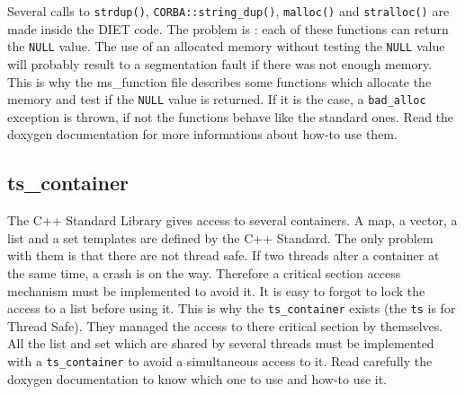 Several calls to \texttt{strdup()}, \texttt{CORBA::string\_dup()},
\texttt{malloc()} and \texttt{stralloc()} are made inside the DIET code. The
problem is : each of these functions can return the \texttt{NULL} value. The
use of an allocated memory without testing the \texttt{NULL} value will
probably result to a segmentation fault if there was not enough memory. This
is why the \textsf{ms\_function} file describes some functions which allocate
the memory and test if the \texttt{NULL} value is returned. If it is the case,
a \texttt{bad\_alloc} exception is thrown, if not the functions behave like the
standard ones. Read the doxygen documentation for more informations about
how-to use them.

\subsection{\textsf{ts\_container}}

The C++ Standard Library gives access to several containers. A map, a vector, a
list and a set templates are defined by the C++ Standard. The only problem with
them is that there are not thread safe. If two threads alter a container at the
same time, a crash is on the way. Therefore a critical section access mechanism
must be implemented to avoid it. It is easy to forgot to lock the access to a
list before using it. This is why the \texttt{ts\_container} exists (the
\texttt{ts} is for Thread Safe). They managed the access to there critical
section by themselves. All the list and set which are shared by several threads
must be implemented with a \texttt{ts\_container} to avoid a simultaneous
access to it. Read carefully the doxygen documentation to know which one to use
and how-to use it.
